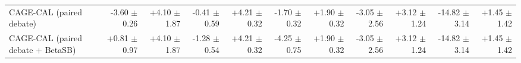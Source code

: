 \begin{tabular}{lrrrrrrrrrr}
CAGE-CAL (paired debate) & -3.60 {\scriptsize $\pm$ 0.26} & +4.10 {\scriptsize $\pm$ 1.87} & -0.41 {\scriptsize $\pm$ 0.59} & +4.21 {\scriptsize $\pm$ 0.32} & -1.70 {\scriptsize $\pm$ 0.32} & +1.90 {\scriptsize $\pm$ 0.32} & -3.05 {\scriptsize $\pm$ 2.56} & +3.12 {\scriptsize $\pm$ 1.24} & -14.82 {\scriptsize $\pm$ 3.14} & +1.45 {\scriptsize $\pm$ 1.42} \\
CAGE-CAL (paired debate + BetaSB) & +0.81 {\scriptsize $\pm$ 0.97} & +4.10 {\scriptsize $\pm$ 1.87} & -1.28 {\scriptsize $\pm$ 0.54} & +4.21 {\scriptsize $\pm$ 0.32} & -4.25 {\scriptsize $\pm$ 0.75} & +1.90 {\scriptsize $\pm$ 0.32} & -3.05 {\scriptsize $\pm$ 2.56} & +3.12 {\scriptsize $\pm$ 1.24} & -14.82 {\scriptsize $\pm$ 3.14} & +1.45 {\scriptsize $\pm$ 1.42} \\
\bottomrule
\end{tabular}
